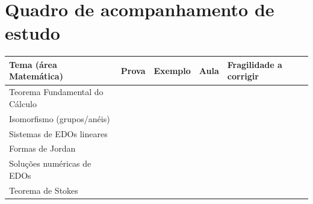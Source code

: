 \documentclass[11pt,a4paper]{article}
\begin{document}
\section{Quadro de acompanhamento de estudo}
\renewcommand{\arraystretch}{1.55}
\begin{tabularx}{\textwidth}{p{}p{}p{}p{}X}
\toprule
\textbf{Tema (área Matemática)} & \textbf{Prova} & \textbf{Exemplo} & \textbf{Aula} & \textbf{Fragilidade a corrigir}\\\midrule
Teorema Fundamental do Cálculo & & & & \\
Isomorfismo (grupos/anéis) & & & & \\
Sistemas de EDOs lineares & & & & \\
Formas de Jordan & & & & \\
Soluções numéricas de EDOs & & & & \\
Teorema de Stokes & & & & \\
\bottomrule
\end{tabularx}
\renewcommand{\arraystretch}{1}
\end{document}
